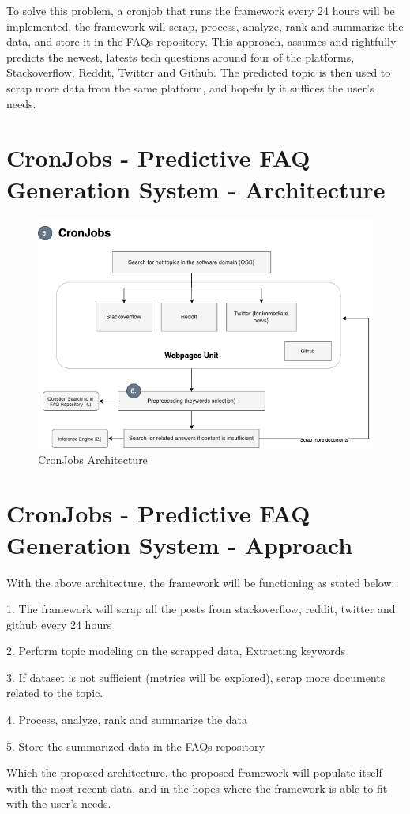To solve this problem, a cronjob that runs the framework every 24 hours will be implemented, the framework will scrap, process, analyze, rank and summarize the data, and store it in the FAQs repository. This approach, assumes and rightfully predicts the newest, latests tech questions around four of the platforms, Stackoverflow, Reddit, Twitter and Github. The predicted topic is then used to scrap more data from the same platform, and hopefully it suffices the user's needs.

\section{CronJobs - Predictive FAQ Generation System - Architecture}
\newpage
\begin{figure}[t] 
  \noindent \includegraphics[scale=0.6, angle=0]{assets/cron_job_workflow.png}
\caption{CronJobs Architecture}\label{cronjobs_architecture}
\end{figure}
\newpage

\section{CronJobs - Predictive FAQ Generation System - Approach}
With the above architecture, the framework will be functioning as stated below:

1. The framework will scrap all the posts from stackoverflow, reddit, twitter and github every 24 hours

2. Perform topic modeling on the scrapped data, Extracting keywords

3. If dataset is not sufficient (metrics will be explored), scrap more documents related to the topic. 

4. Process, analyze, rank and summarize the data 

5. Store the summarized data in the FAQs repository

Which the proposed architecture, the proposed framework will populate itself with the most recent data, and in the hopes where the framework is able to fit with the user's needs.